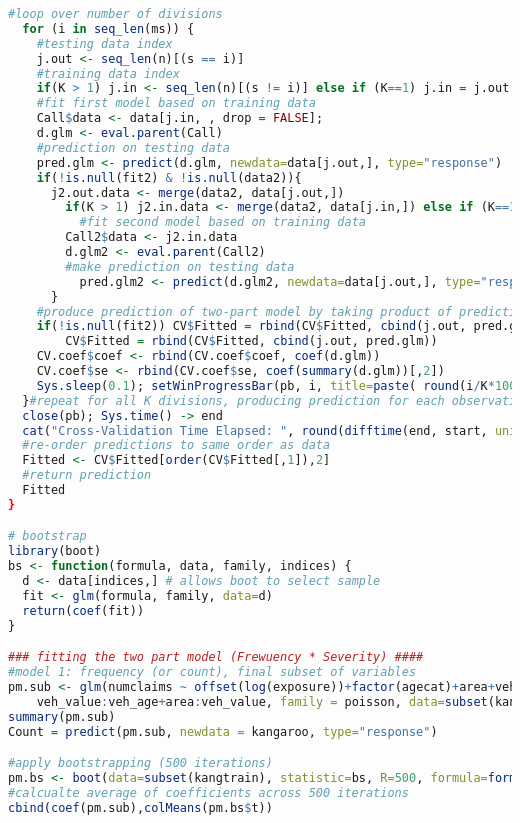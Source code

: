 \documentclass[a4paper]{article}\usepackage[]{graphicx}\usepackage[]{color}
\begin{document}
\begin{lstlisting}[language=R]
  #loop over number of divisions
  for (i in seq_len(ms)) {
    #testing data index
    j.out <- seq_len(n)[(s == i)]
    #training data index
    if(K > 1) j.in <- seq_len(n)[(s != i)] else if (K==1) j.in = j.out
    #fit first model based on training data
    Call$data <- data[j.in, , drop = FALSE]; 
    d.glm <- eval.parent(Call)
    #prediction on testing data
    pred.glm <- predict(d.glm, newdata=data[j.out,], type="response")
    if(!is.null(fit2) & !is.null(data2)){
      j2.out.data <- merge(data2, data[j.out,])
	    if(K > 1) j2.in.data <- merge(data2, data[j.in,]) else if (K==1) j2.in.data = j2.out.data
	      #fit second model based on training data
      	Call2$data <- j2.in.data
        d.glm2 <- eval.parent(Call2)
        #make prediction on testing data
	      pred.glm2 <- predict(d.glm2, newdata=data[j.out,], type="response")
      }
    #produce prediction of two-part model by taking product of predictions from both models
    if(!is.null(fit2)) CV$Fitted = rbind(CV$Fitted, cbind(j.out, pred.glm*pred.glm2)) else 
    	CV$Fitted = rbind(CV$Fitted, cbind(j.out, pred.glm))
    CV.coef$coef <- rbind(CV.coef$coef, coef(d.glm))
    CV.coef$se <- rbind(CV.coef$se, coef(summary(d.glm))[,2])
    Sys.sleep(0.1); setWinProgressBar(pb, i, title=paste( round(i/K*100, 0),"% done"))
  }#repeat for all K divisions, producing prediction for each observation in data
  close(pb); Sys.time() -> end
  cat("Cross-Validation Time Elapsed: ", round(difftime(end, start, units="secs"),3) ,"seconds \n")
  #re-order predictions to same order as data
  Fitted <- CV$Fitted[order(CV$Fitted[,1]),2]
  #return prediction
  Fitted
}

# bootstrap
library(boot)
bs <- function(formula, data, family, indices) {
  d <- data[indices,] # allows boot to select sample 
  fit <- glm(formula, family, data=d)
  return(coef(fit)) 
} 

### fitting the two part model (Frewuency * Severity) ####
#model 1: frequency (or count), final subset of variables
pm.sub <- glm(numclaims ~ offset(log(exposure))+factor(agecat)+area+veh_value+veh_age+
	veh_value:veh_age+area:veh_value, family = poisson, data=subset(kangtrain))
summary(pm.sub)
Count = predict(pm.sub, newdata = kangaroo, type="response")

#apply bootstrapping (500 iterations)
pm.bs <- boot(data=subset(kangtrain), statistic=bs, R=500, formula=formula(pm.sub), family = poisson, parallel="multicore")
#calcualte average of coefficients across 500 iterations
cbind(coef(pm.sub),colMeans(pm.bs$t))


\end{lstlisting}
\end{document}
